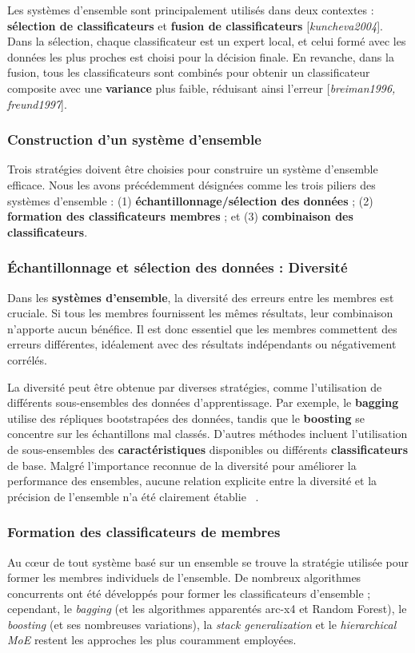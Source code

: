 Les systèmes d'ensemble sont principalement utilisés dans deux contextes : \textbf{sélection de classificateurs} et \textbf{fusion de classificateurs} [\textit{kuncheva2004}]. Dans la sélection, chaque classificateur est un expert local, et celui formé avec les données les plus proches est choisi pour la décision finale. En revanche, dans la fusion, tous les classificateurs sont combinés pour obtenir un classificateur composite avec une \textbf{variance} plus faible, réduisant ainsi l'erreur [\textit{breiman1996, freund1997}].
\subsubsection*{Construction d'un système d'ensemble}
Trois stratégies doivent être choisies pour construire un système d'ensemble
efficace. Nous les avons précédemment désignées comme les trois piliers des
systèmes d'ensemble : (1) \textbf{échantillonnage/sélection des données} ; (2) \textbf{formation des classificateurs membres} ; et (3) \textbf{combinaison des classificateurs}.

\subsubsection{Échantillonnage et sélection des données : Diversité}
Dans les \textbf{systèmes d'ensemble}, la diversité des erreurs entre les membres est cruciale. Si tous les membres fournissent les mêmes résultats, leur combinaison n'apporte aucun bénéfice. Il est donc essentiel que les membres commettent des erreurs différentes, idéalement avec des résultats indépendants ou négativement corrélés.

La diversité peut être obtenue par diverses stratégies, comme l'utilisation de différents sous-ensembles des données d'apprentissage. Par exemple, le \textbf{bagging} utilise des répliques bootstrapées des données, tandis que le \textbf{boosting} se concentre sur les échantillons mal classés. D'autres méthodes incluent l'utilisation de sous-ensembles des \textbf{caractéristiques} disponibles ou différents \textbf{classificateurs} de base. Malgré l'importance reconnue de la diversité pour améliorer la performance des ensembles, aucune relation explicite entre la diversité et la précision de l'ensemble n'a été clairement établie ~\cite{polikar2012ensemble}.

\subsubsection{Formation des classificateurs de membres}
Au cœur de tout système basé sur un ensemble se trouve la stratégie utilisée pour former les membres individuels de l'ensemble. De nombreux algorithmes concurrents ont été développés pour former les classificateurs d'ensemble ; cependant, le \textit{bagging} (et les algorithmes apparentés arc-x4 et Random Forest), le \textit{boosting} (et ses nombreuses variations), la \textit{stack generalization} et le \textit{hierarchical MoE} restent les approches les plus couramment employées.

